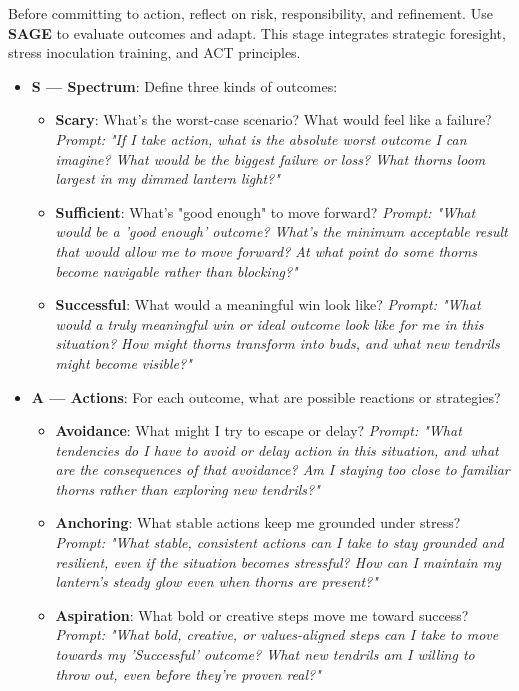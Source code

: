 \documentclass{article}
\begin{document}
Before committing to action, reflect on risk, responsibility, and refinement. Use \textbf{SAGE} to evaluate outcomes and adapt. This stage integrates strategic foresight, stress inoculation training, and ACT principles.

\begin{itemize}[noitemsep,topsep=0pt]
    \item \textbf{S — Spectrum}: Define three kinds of outcomes:
    \begin{itemize}[noitemsep,topsep=0pt]
        \item \textbf{Scary}: What's the worst-case scenario? What would feel like a failure? \textit{Prompt: "If I take action, what is the absolute worst outcome I can imagine? What would be the biggest failure or loss? What thorns loom largest in my dimmed lantern light?"}
        \item \textbf{Sufficient}: What's "good enough" to move forward? \textit{Prompt: "What would be a 'good enough' outcome? What's the minimum acceptable result that would allow me to move forward? At what point do some thorns become navigable rather than blocking?"}
        \item \textbf{Successful}: What would a meaningful win look like? \textit{Prompt: "What would a truly meaningful win or ideal outcome look like for me in this situation? How might thorns transform into buds, and what new tendrils might become visible?"}
    \end{itemize}
    \item \textbf{A — Actions}: For each outcome, what are possible reactions or strategies?
    \begin{itemize}[noitemsep,topsep=0pt]
        \item \textbf{Avoidance}: What might I try to escape or delay? \textit{Prompt: "What tendencies do I have to avoid or delay action in this situation, and what are the consequences of that avoidance? Am I staying too close to familiar thorns rather than exploring new tendrils?"}
        \item \textbf{Anchoring}: What stable actions keep me grounded under stress? \textit{Prompt: "What stable, consistent actions can I take to stay grounded and resilient, even if the situation becomes stressful? How can I maintain my lantern's steady glow even when thorns are present?"}
        \item \textbf{Aspiration}: What bold or creative steps move me toward success? \textit{Prompt: "What bold, creative, or values-aligned steps can I take to move towards my 'Successful' outcome? What new tendrils am I willing to throw out, even before they're proven real?"}

\end{itemize}
\end{itemize}
\end{document}

